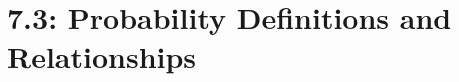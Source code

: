 \documentclass[Lecture.tex]{subfiles}
\begin{document}
\section{7.3: Probability Definitions and Relationships}

\begin{frame}

\end{frame}
\end{document}
